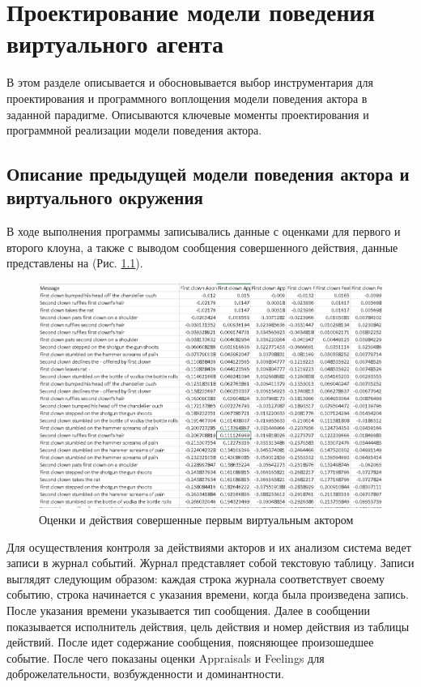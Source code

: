 \chapter{Проектирование модели поведения виртуального агента}

В этом разделе описывается и обосновывается выбор инструментария для проектирования и программного воплощения 
модели поведения актора в заданной парадигме. Описываются ключевые моменты проектирования и программной реализации модели поведения актора.

\section{Описание предыдущей модели поведения актора и виртуального окружения}

В ходе выполнения программы записывались данные с оценками для первого и второго клоуна, а также с выводом сообщения совершенного 
действия, данные представлены на (Рис. \ref{pic:ris10}).

\begin{figure}[h]
\includegraphics[width=0.75\columnwidth]{./img/ris10.png}
\centering
\caption{Оценки и действия совершенные первым виртуальным актором}
\label{pic:ris10}
\end{figure}

Для осуществления контроля за действиями акторов и их анализом система ведет записи в журнал событий. 
Журнал представляет собой текстовую таблицу. Записи выглядят следующим образом: каждая строка журнала соответствует своему событию, 
строка начинается с указания времени, когда была произведена запись. После указания времени указывается тип сообщения. 
Далее в сообщении показывается исполнитель действия, цель действия и номер действия из таблицы действий. 
После идет содержание сообщения, поясняющее произошедшее событие. После чего показаны оценки Appraisals и 
Feelings для доброжелательности, возбужденности и доминантности.

